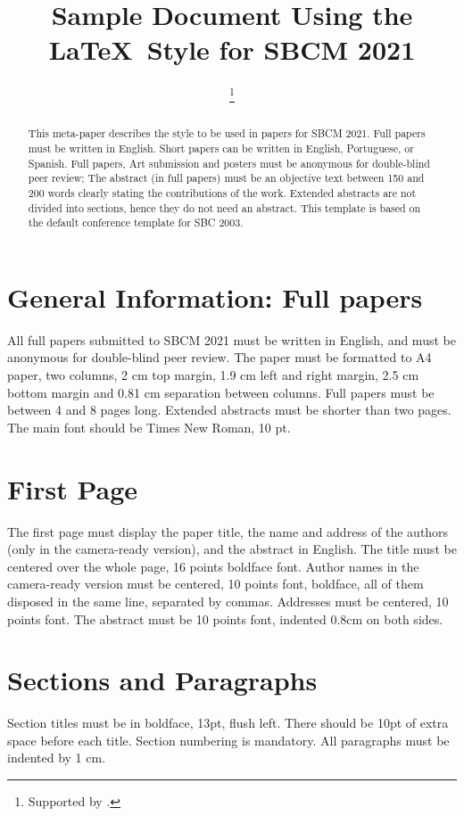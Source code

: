 \documentclass[10pt,times,twocolumn]{article}
\title{Sample Document Using the \LaTeX\ Style for SBCM 2021}
\author{\anonymize{First Author}\inst{1}\thanks{Supported by \anonymize{CAPES}.} \and
        \anonymize{Second Author}\inst{1}\inst{2}}
\begin{document}
\maketitle

\begin{abstract}
This meta-paper describes the style to be used in papers for SBCM 2021.
Full papers must be written in English. Short papers can be written in English, Portuguese, or Spanish.
Full papers, Art submission and posters must be anonymous for double-blind peer review; The abstract (in full papers) must be an objective text between 150 and 200 words clearly stating the contributions of the work.
Extended abstracts are not divided into sections, hence they do not need an abstract.
This template is based on the default conference template for SBC 2003.
\end{abstract}


\section{General Information: Full papers}\label{sec:gen}

All full papers submitted to SBCM 2021 must be written in English, and must be anonymous for double-blind peer review. The paper must be formatted to A4 paper, two columns, 2 cm top margin, 1.9 cm left and right
margin, 2.5 cm bottom margin and 0.81 cm separation between columns. Full papers must be between 4 and 8 pages long. Extended abstracts must be shorter than two pages. The main font should be Times New Roman, 10 pt.

\section{First Page}

The first page must display the paper title, the name and address of the authors (only in the camera-ready version), and the abstract in English. The title must be centered over the whole page, 16 points boldface font. Author names in the camera-ready version must be centered, 10 points font, boldface, all of them disposed in the same line, separated by commas. Addresses must be centered, 10 points font.
The abstract must be 10 points font, indented 0.8cm on both sides.

\section{Sections and Paragraphs}
Section titles must be in boldface, 13pt, flush left. There should be 10pt of extra space before each title. Section numbering is mandatory. All paragraphs must be indented by 1 cm.
\end{document}
